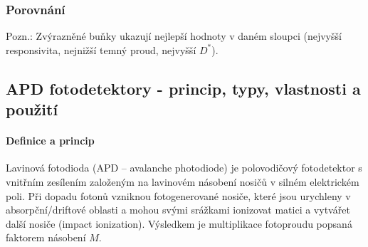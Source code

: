 \documentclass[a4paper, 12pt]{article}
\begin{document}
            \subsubsection{Porovnání}
            \begin{table}[H]
                \centering
                \caption{Srovnání vybraných fotodiod}
                \label{tab:fotodiody_porovnani}
                \vspace{4pt}
                \footnotesize{Pozn.: Zvýrazněné buňky ukazují nejlepší hodnoty v daném sloupci (nejvyšší responsivita, nejnižší temný proud, nejvyšší $D^*$).}
            \end{table}
        \subsection{APD fotodetektory - princip, typy, vlastnosti a použití}
        \paragraph{Definice a princip}
        Lavinová fotodioda (APD -- avalanche photodiode) je polovodičový fotodetektor s vnitřním zesílením
        založeným na lavinovém násobení nosičů v silném elektrickém poli. Při dopadu fotonů vzniknou
        fotogenerované nosiče, které jsou urychleny v absorpční/driftové oblasti a mohou svými srážkami
        ionizovat matici a vytvářet další nosiče (impact ionization). Výsledkem je multiplikace
        fotoproudu popsaná faktorem násobení $M$.
\end{document}
